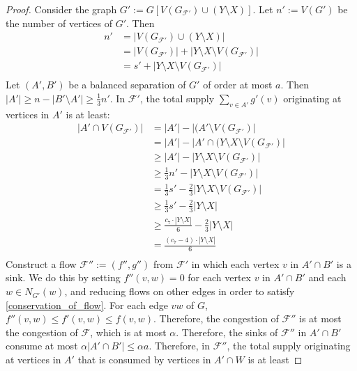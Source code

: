 \documentclass{patmorin}
\begin{document}
\begin{proof}
  Consider the graph $G':=G[V(G_{\mathcal{F}'})\cup (Y\setminus X)]$.  Let $n':=V(G')$ be the number of vertices of $G'$.  Then
  \begin{align*}
     n' & = |V(G_{\mathcal{F}'})\cup (Y\setminus X)| \\
        & = |V(G_{\mathcal{F}'})| + |Y\setminus X\setminus V(G_{\mathcal{F}'})| \\
        & = s' + |Y\setminus X\setminus V(G_{\mathcal{F}'})| \\
  \end{align*}
  Let $(A',B')$ be a balanced separation of $G'$ of order at most $a$.  Then $|A'|\ge n - |B'\setminus A'|\ge \tfrac{1}{3}n'$.  In $\mathcal{F}'$, the total supply $\sum_{v\in A'}g'(v)$ originating at vertices in $A'$ is at least:
  \begin{align*}
    |A'\cap V(G_{\mathcal{F}'})|
    & = |A'| - |(A'\setminus V(G_{\mathcal{F}'})| \\
    & = |A'| - |A'\cap (Y\setminus X\setminus V(G_{\mathcal{F}'})| \\
    & \ge |A'| - |Y\setminus X\setminus V(G_{\mathcal{F}'})| \\
    & \ge \tfrac{1}{3}n' - |Y\setminus X\setminus V(G_{\mathcal{F}'})| \\
    & = \tfrac{1}{3}s' - \tfrac{2}{3}|Y\setminus X\setminus V(G_{\mathcal{F}'})| \\
    & \ge \tfrac{1}{3}s' - \tfrac{2}{3}|Y\setminus X| \\
    & \ge \frac{c_7\cdot|Y\setminus X|}{6} - \tfrac{2}{3}|Y\setminus X| \\
    & = \frac{(c_7-4)\cdot |Y\setminus X|}{6} \\
  \end{align*}
  Construct a flow $\mathcal{F}'':=(f'',g'')$ from $\mathcal{F}'$ in which each vertex $v$ in $A'\cap B'$ is a sink.  We do this by setting $f''(v,w)=0$ for each vertex $v$ in $A'\cap B'$ and each $w\in N_{G'}(w)$, and reducing flows on other edges in order to satisfy \eqref{conservation_of_flow}.  For each edge $vw$ of $G$, $f''(v,w)\le f'(v,w)\le f(v,w)$. Therefore, the congestion of $\mathcal{F}''$ is at most the congestion of $\mathcal{F}$, which is at most $\alpha$.  Therefore, the sinks of $\mathcal{F}''$ in $A'\cap B'$ consume at most $\alpha|A'\cap B'|\le \alpha a$. Therefore, in $\mathcal{F}''$, the total supply originating at vertices in $A'$ that is consumed by vertices in $A'\cap W$ is at least

\end{proof}
\end{document}

